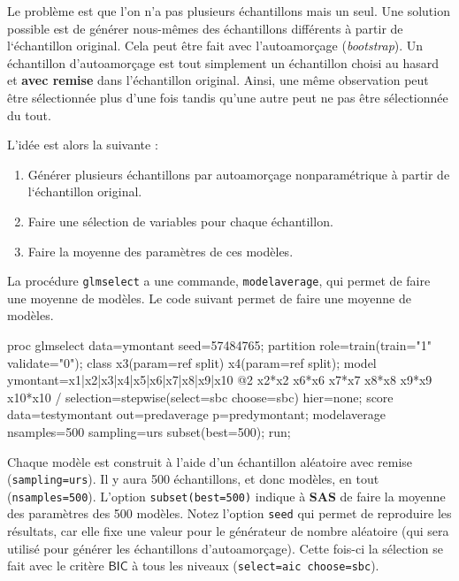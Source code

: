 \documentclass[
  11pt,
  letterpaper,
]{book}
\newenvironment{Shaded}{\begin{snugshade}}{\end{snugshade}}
\newcommand{\NormalTok}[1]{#1}
\providecommand{\tightlist}{%
  \setlength{\itemsep}{0pt}\setlength{\parskip}{0pt}}
\theoremstyle{definition}
\theoremstyle{definition}
\theoremstyle{definition}
\theoremstyle{definition}
\theoremstyle{remark}
\begin{document}
Le problème est que l'on n'a pas plusieurs échantillons mais un seul. Une solution possible est de générer nous-mêmes des échantillons différents à partir de l`échantillon original. Cela peut être fait avec l'autoamorçage (\emph{bootstrap}). Un échantillon d'autoamorçage est tout simplement un échantillon choisi au hasard et \textbf{avec remise} dans l'échantillon original. Ainsi, une même observation peut être sélectionnée plus d'une fois tandis qu'une autre peut ne pas être sélectionnée du tout.

L'idée est alors la suivante :

\begin{enumerate}
\def\labelenumi{\arabic{enumi})}
\tightlist
\item
  Générer plusieurs échantillons par autoamorçage nonparamétrique à partir de l`échantillon original.
\item
  Faire une sélection de variables pour chaque échantillon.
\item
  Faire la moyenne des paramètres de ces modèles.
\end{enumerate}

La procédure \texttt{glmselect} a une commande, \texttt{modelaverage}, qui permet de faire une moyenne de modèles. Le code suivant permet de faire une moyenne de modèles.

\begin{Shaded}
\begin{Highlighting}[]
\NormalTok{proc glmselect data=ymontant seed=57484765;}
\NormalTok{partition role=train(train="1" validate="0");}
\NormalTok{class x3(param=ref split) x4(param=ref split);}
\NormalTok{model ymontant=x1|x2|x3|x4|x5|x6|x7|x8|x9|x10 @2}
\NormalTok{x2*x2 x6*x6 x7*x7 x8*x8 x9*x9 x10*x10 / }
\NormalTok{selection=stepwise(select=sbc choose=sbc) hier=none; }
\NormalTok{score data=testymontant out=predaverage p=predymontant;}
\NormalTok{modelaverage nsamples=500 sampling=urs subset(best=500);}
\NormalTok{run;}
\end{Highlighting}
\end{Shaded}

Chaque modèle est construit à l'aide d'un échantillon aléatoire avec remise (\texttt{sampling=urs}). Il y aura 500 échantillons, et donc modèles, en tout (\texttt{nsamples=500}). L'option \texttt{subset(best=500)} indique à \textbf{SAS} de faire la moyenne des paramètres des 500 modèles. Notez l'option \texttt{seed} qui permet de reproduire les résultats, car elle fixe une valeur pour le générateur de nombre aléatoire (qui sera utilisé pour générer les échantillons d'autoamorçage). Cette fois-ci la sélection se fait avec le critère \(\mathsf{BIC}\) à tous les niveaux (\texttt{select=aic\ choose=sbc}).
\end{document}
